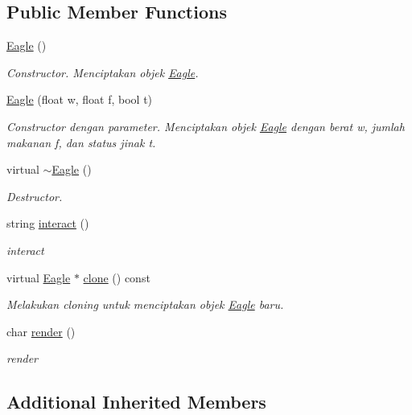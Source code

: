 \subsection*{Public Member Functions}
\begin{DoxyCompactItemize}
\item 
\hyperlink{classEagle_a8b205e5b26bece07d18b852b042851fe}{Eagle} ()
\begin{DoxyCompactList}\small\item\em Constructor. Menciptakan objek \hyperlink{classEagle}{Eagle}. \end{DoxyCompactList}\item 
\hyperlink{classEagle_ae59cc80952be37499b10e270714af1d8}{Eagle} (float w, float f, bool t)
\begin{DoxyCompactList}\small\item\em Constructor dengan parameter. Menciptakan objek \hyperlink{classEagle}{Eagle} dengan berat w, jumlah makanan f, dan status jinak t. \end{DoxyCompactList}\item 
virtual \hyperlink{classEagle_a530318b3eb744ad26c9060d61aa314fe}{$\sim$\+Eagle} ()
\begin{DoxyCompactList}\small\item\em Destructor. \end{DoxyCompactList}\item 
string \hyperlink{classEagle_a698f925269924e7e9f9b9c92899de01d}{interact} ()
\begin{DoxyCompactList}\small\item\em interact \end{DoxyCompactList}\item 
virtual \hyperlink{classEagle}{Eagle} $\ast$ \hyperlink{classEagle_a7f52d72ac0ef220df4f85c6cb8987d2d}{clone} () const 
\begin{DoxyCompactList}\small\item\em Melakukan cloning untuk menciptakan objek \hyperlink{classEagle}{Eagle} baru. \end{DoxyCompactList}\item 
char \hyperlink{classEagle_a1a97b6a2a2dbe76a6ddf3dc15e5f36d4}{render} ()
\begin{DoxyCompactList}\small\item\em render \end{DoxyCompactList}\end{DoxyCompactItemize}
\subsection*{Additional Inherited Members}


